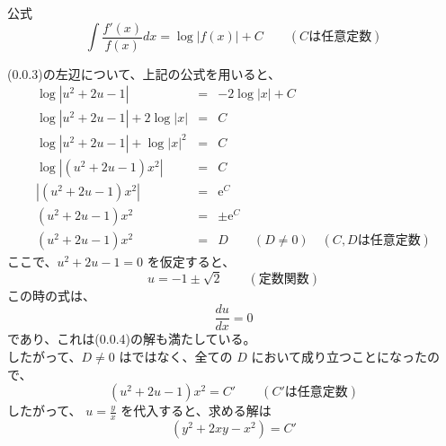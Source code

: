 \documentclass[a4j]{jsarticle}
\begin{document}
\begin{spacing}{1.6}
\begin{qparts}
\begin{itembox}{公式}
       \begin{equation}
         \int \frac{f{\prime}(x)}{f(x)} dx = \log |f(x)| + C \qquad (Cは任意定数) \nonumber
       \end{equation}
    \end{itembox}
    (0.0.3)の左辺について、上記の公式を用いると、
    \begin{eqnarray}
      \log |u ^ 2 + 2u - 1| & = & -2 \log |x| + C \nonumber \\
      \log |u ^ 2 + 2u - 1| + 2 \log |x| & = & C \nonumber \\
      \log |u ^ 2 + 2u - 1| + \log |x| ^ 2 & = & C \nonumber \\
      \log |(u ^ 2 + 2u - 1)x ^ 2| & = & C \nonumber \\
      |(u ^ 2 + 2u - 1)x ^ 2| & = & \mathrm{e} ^ C \nonumber \\
      (u ^ 2 + 2u - 1)x ^ 2 & = & \pm \mathrm{e} ^ C \nonumber \\
      (u ^ 2 + 2u - 1)x ^ 2 & = & D \nonumber \qquad (D \neq 0) \quad (C, D は任意定数)
    \end{eqnarray}
    ここで、$ u ^ 2 + 2u - 1 = 0 $ を仮定すると、\\
    \begin{equation}
      u = -1 \pm \sqrt{2} \qquad (定数関数)
    \end{equation}
    この時の式は、
    \begin{equation}
      \frac{du}{dx} = 0 \nonumber
    \end{equation}
    であり、これは(0.0.4)の解も満たしている。\\
    したがって、$ D \neq 0 $ はではなく、全ての $ D $ において成り立つことになったので、
    \begin{equation}
      (u ^ 2 + 2u - 1)x ^ 2 = C{\prime} \qquad (C{\prime}は任意定数) \nonumber
    \end{equation}
    したがって、 $ \displaystyle u = \frac{y}{x} $ を代入すると、求める解は
    \begin{equation}
      (y ^ 2 + 2xy - x ^ 2) = C{\prime} \nonumber
    \end{equation}
\end{qparts}
\end{spacing}
\end{document}
